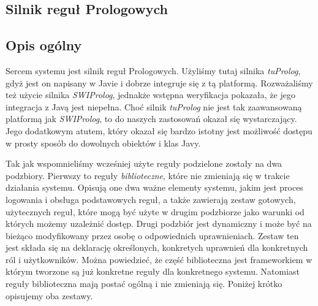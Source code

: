 \documentclass{classrep}
\begin{document}
\subsection{Silnik reguł Prologowych}

\subsection{Opis ogólny}

Sercem systemu jest silnik reguł Prologowych. Użyliśmy tutaj silnika \textsl{tuProlog}, gdyż jest on napisany w Javie i dobrze integruje się z tą platformą. Rozważaliśmy też
użycie silnika \textsl{SWIProlog}, jednakże wstępna weryfikacja pokazała, że jego integracja z Javą jest niepełna. Choć silnik \textsl{tuProlog} nie jest tak zaawansowaną platformą jak
\textsl{SWIProlog}, to do naszych zastosowań okazał się wystarczający. Jego dodatkowym atutem, który okazał się bardzo istotny jest możliwość dostępu w prosty sposób do dowolnych
obiektów i klas Javy.

Tak jak wspomnieliśmy wcześniej użyte reguły podzielone zostały na dwa podzbiory. Pierwszy to reguły \textit{biblioteczne}, które nie zmieniają się w trakcie działania systemu.
Opisują one dwa ważne elementy systemu, jakim jest proces logowania i obsługa podstawowych reguł, a także zawierają zestaw gotowych, użytecznych reguł, które mogą być użyte w drugim
podzbiorze jako warunki od których możemy uzależnić dostęp. Drugi podzbiór jest dynamiczny i może być na bieżąco modyfikowany przez osobę o odpowiednich uprawnieniach. Zestaw ten
jest składa się na deklarację określonych, konkretych uprawnień dla konkretnych ról i użytkowników. Można powiedzieć, że część biblioteczna jest frameworkiem w którym tworzone są już
konkretne reguły dla konkretnego systemu. Natomiast reguły biblioteczna mają postać ogólną i nie zmieniają się. Poniżej krótko opisujemy oba zestawy.
\end{document}
